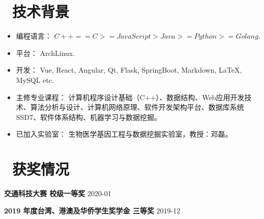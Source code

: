 \documentclass[11pt, a4paper]{article}
\begin{document}
\section{\color{CVBlue}\faCogs\ 技术背景}
\begin{itemize}[parsep=0.5ex]
  \item 编程语言： $C++ == C >= JavaScript > Java >= Python >= Golang$.
  \item 平台： ArchLinux.
  \item 开发： Vue, React, Angular, Qt, Flask, SpringBoot, Markdown, LaTeX, MySQL etc.
  \item 主修专业课程： 计算机程序设计基础（C++）、数据结构、Web应用开发技术、算法分析与设计、计算机网络原理、软件开发架构平台、数据库系统SSD7、软件体系结构、机器学习与数据挖掘。
  \item 已加入实验室： 生物医学基因工程与数据挖掘实验室，教授：邓磊。
\end{itemize}

\section{\color{CVBlue}\faHeart\ 获奖情况}

\textbf{交通科技大赛 \quad 校级一等奖} \hfill 2020-01


\textbf{2019 年度台湾、港澳及华侨学生奖学金 \quad 三等奖} \hfill 2019-12



\end{document}
